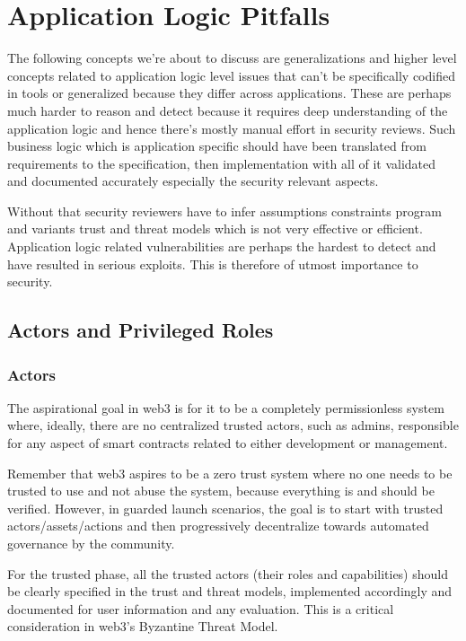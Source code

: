 \section{Application Logic Pitfalls}\label{application-logic-pitfalls}

The following concepts we're about to discuss are generalizations and
higher level concepts related to application logic level issues that
can't be specifically codified in tools or generalized because they
differ across applications. These are perhaps much harder to reason and
detect because it requires deep understanding of the application logic
and hence there's mostly manual effort in security reviews. Such
business logic which is application specific should have been translated
from requirements to the specification, then implementation with all of
it validated and documented accurately especially the security relevant
aspects.

Without that security reviewers have to infer assumptions constraints
program and variants trust and threat models which is not very effective
or efficient. Application logic related vulnerabilities are perhaps the
hardest to detect and have resulted in serious exploits. This is
therefore of utmost importance to security.

\subsection{Actors and Privileged
Roles}\label{actors-and-privileged-roles}

\subsubsection{Actors}\label{actors}

The aspirational goal in web3 is for it to be a completely
permissionless system where, ideally, there are no centralized trusted
actors, such as admins, responsible for any aspect of smart contracts
related to either development or management.

Remember that web3 aspires to be a zero trust system where no one needs
to be trusted to use and not abuse the system, because everything is and
should be verified. However, in guarded launch scenarios, the goal is to
start with trusted actors/assets/actions and then progressively
decentralize towards automated governance by the community.

For the trusted phase, all the trusted actors (their roles and
capabilities) should be clearly specified in the trust and threat
models, implemented accordingly and documented for user information and
any evaluation. This is a critical consideration in web3's Byzantine
Threat Model.

